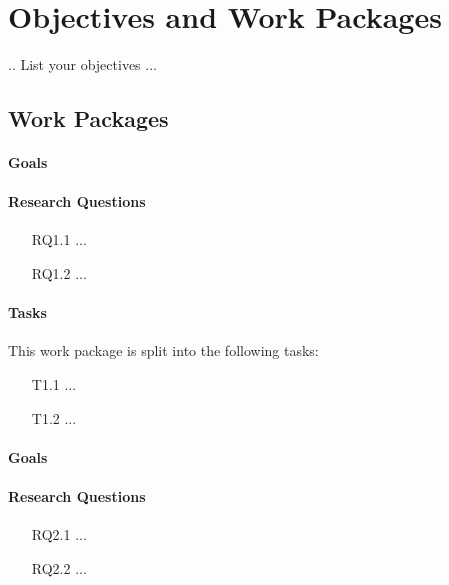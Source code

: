 
\chapter{Objectives and Work Packages}

.. List your objectives ...
\section{Work Packages}
\label{sec-workpackages}




\subsubsection{Goals}


\subsubsection{Research Questions}
\begin{itemize}
	\item[RQ1.1] ...
	\item[RQ1.2] ...
\end{itemize}

\subsubsection{Tasks}
This work package is split into the following tasks:
\begin{itemize}
	\item[T1.1] ...
	\item[T1.2] ...
\end{itemize}


\subsubsection{Goals}


\subsubsection{Research Questions}
\begin{itemize}
	\item[RQ2.1] ...
	\item[RQ2.2] ...
\end{itemize}

